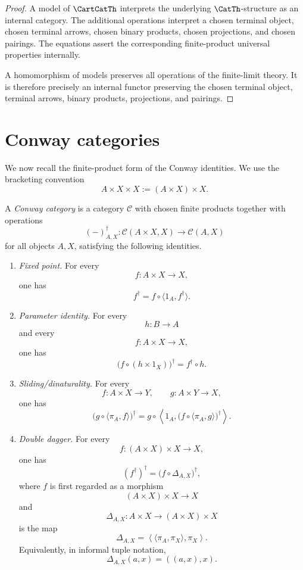 \begin{proof}
A model of \(\CartCatTh\) interprets the underlying \(\CatTh\)-structure as an
internal category.  The additional operations interpret a chosen terminal
object, chosen terminal arrows, chosen binary products, chosen projections,
and chosen pairings.  The equations assert the corresponding finite-product
universal properties internally.

A homomorphism of models preserves all operations of the finite-limit theory.
It is therefore precisely an internal functor preserving the chosen terminal
object, terminal arrows, binary products, projections, and pairings.
\end{proof}

\section{Conway categories}
\label{sec:conway-categories}

We now recall the finite-product form of the Conway identities.  We use the
bracketing convention
\[
A\times X\times X := (A\times X)\times X.
\]

\begin{definition}
\label{def:conway-category}
A \emph{Conway category} is a category \(\mathcal C\) with chosen finite
products together with operations
\[
(-)^\dagger_{A,X}:
\mathcal C(A\times X,X)\to \mathcal C(A,X)
\]
for all objects \(A,X\), satisfying the following identities.

\begin{enumerate}
\item \emph{Fixed point.}  For every
\[
f:A\times X\to X,
\]
one has
\[
f^\dagger
=
f\circ \langle 1_A,f^\dagger\rangle.
\]

\item \emph{Parameter identity.}  For every
\[
h:B\to A
\]
and every
\[
f:A\times X\to X,
\]
one has
\[
\bigl(f\circ(h\times 1_X)\bigr)^\dagger
=
f^\dagger\circ h.
\]

\item \emph{Sliding/dinaturality.}  For every
\[
f:A\times X\to Y,
\qquad
g:A\times Y\to X,
\]
one has
\[
\bigl(g\circ\langle \pi_A,f\rangle\bigr)^\dagger
=
g\circ
\left\langle
1_A,
\bigl(f\circ\langle \pi_A,g\rangle\bigr)^\dagger
\right\rangle.
\]

\item \emph{Double dagger.}  For every
\[
f:(A\times X)\times X\to X,
\]
one has
\[
(f^\dagger)^\dagger
=
\bigl(f\circ\Delta_{A,X}\bigr)^\dagger,
\]
where \(f\) is first regarded as a morphism
\[
(A\times X)\times X\to X
\]
and
\[
\Delta_{A,X}:A\times X\to (A\times X)\times X
\]
is the map
\[
\Delta_{A,X}
=
\left\langle
\langle \pi_A,\pi_X\rangle,
\pi_X
\right\rangle.
\]
Equivalently, in informal tuple notation,
\[
\Delta_{A,X}(a,x)=((a,x),x).
\]
\end{enumerate}
\end{definition}

